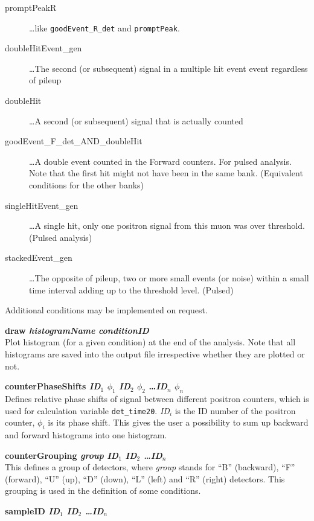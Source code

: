 \documentclass[twoside]{dis04}
\begin{document}
\begin{description}
\begin{description}
	\item[promptPeakR]                \ldots  like {\tt goodEvent\_R\_det} and {\tt promptPeak}.
	\item[doubleHitEvent\_gen]	\ldots The second (or subsequent) signal in a multiple hit event event regardless of pileup
	\item[doubleHit]			\ldots A second (or subsequent) signal that is actually counted
	\item[goodEvent\_F\_det\_AND\_doubleHit] \ldots A double event counted in the Forward counters. For pulsed analysis. Note that the first hit might not have been in the same bank. (Equivalent conditions for the other banks)
	\item[singleHitEvent\_gen]		\ldots A single hit, only one positron signal from this muon was over threshold. (Pulsed analysis)
	\item[stackedEvent\_gen]		\ldots The opposite of pileup, two or more small events (or noise) within a small time interval adding up to the threshold level. (Pulsed)
     \end{description}
     Additional conditions may be implemented on request.
  \item{\bf draw \emph{histogramName} \emph{conditionID} } \\
    Plot histogram (for a given condition)  at the end of the analysis. Note that all histograms
    are saved into the output file irrespective whether they are plotted or not.
   \item{\bf  counterPhaseShifts \emph{ID$_1$} \emph{$\phi_1$} \emph{ID$_2$} \emph{$\phi_2$} \ldots \emph{ID$_n$} \emph{$\phi_n$} }\\
     Defines relative phase shifts of signal between different positron counters, which is used
     for calculation variable {\tt det\_time20}. \emph{ID$_i$} is the ID number of the positron counter,
     \emph{$\phi_i$} is its phase shift.  This gives the user a possibility to sum up backward and
     forward histograms into one histogram.
   \item{\bf  counterGrouping \emph{group} \emph{ID$_1$ ID$_2$ \ldots ID$_n$} } \\
     This defines a group of detectors, where \emph{group} stands for ``B'' (backward), 
     ``F'' (forward), ``U'' (up), ``D'' (down), ``L'' (left) and ``R'' (right) detectors.
     This grouping is used in the definition of some conditions.
   \item{\bf sampleID \emph{ID$_1$ ID$_2$ \ldots ID$_n$} } \\

\end{description}
\end{document}
